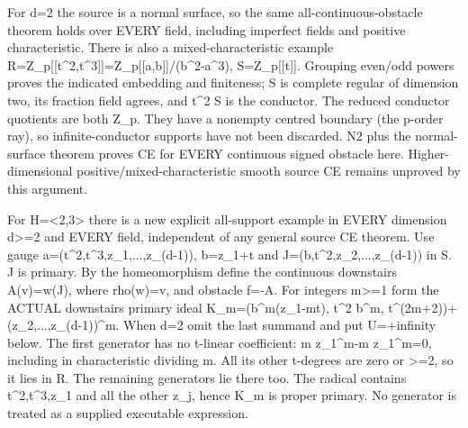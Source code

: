 For d=2 the source is a normal surface, so the same all-continuous-obstacle theorem holds over EVERY field, including imperfect fields and positive characteristic. There is also a mixed-characteristic example R=Z\_p[[t\textasciicircum{}2,t\textasciicircum{}3]]=Z\_p[[a,b]]/(b\textasciicircum{}2-a\textasciicircum{}3), S=Z\_p[[t]]. Grouping even/odd powers proves the indicated embedding and finiteness; S is complete regular of dimension two, its fraction field agrees, and t\textasciicircum{}2 S is the conductor. The reduced conductor quotients are both Z\_p. They have a nonempty centred boundary (the p-order ray), so infinite-conductor supports have not been discarded. N2 plus the normal-surface theorem proves CE for EVERY continuous signed obstacle here. Higher-dimensional positive/mixed-characteristic smooth source CE remains unproved by this argument.

For H=\textless{}2,3\textgreater{} there is a new explicit all-support example in EVERY dimension d\textgreater{}=2 and EVERY field, independent of any general source CE theorem. Use gauge a=(t\textasciicircum{}2,t\textasciicircum{}3,z\_1,...,z\_(d-1)), b=z\_1+t and J=(b,t\textasciicircum{}2,z\_2,...,z\_(d-1)) in S. J is primary. By the homeomorphism define the continuous downstairs A(v)=w(J), where rho(w)=v, and obstacle f=-A. For integers m\textgreater{}=1 form the ACTUAL downstairs primary ideal
K\_m=(b\textasciicircum{}m(z\_1-mt), t\textasciicircum{}2 b\textasciicircum{}m, t\textasciicircum{}(2m+2))+(z\_2,...,z\_(d-1))\textasciicircum{}m.
When d=2 omit the last summand and put U=+infinity below. The first generator has no t-linear coefficient: m z\_1\textasciicircum{}m-m z\_1\textasciicircum{}m=0, including in characteristic dividing m. All its other t-degrees are zero or \textgreater{}=2, so it lies in R. The remaining generators lie there too. The radical contains t\textasciicircum{}2,t\textasciicircum{}3,z\_1 and all the other z\_j, hence K\_m is proper primary. No generator is treated as a supplied executable expression.

